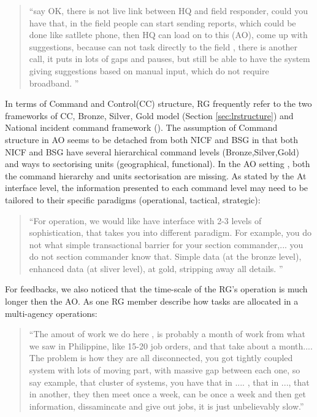 \begin{quotation}
``say  OK, there is not live link between HQ and field responder, could you have that, in the field people can start sending reports, which could be done like satllete phone, then HQ can load on to this (AO), come up with suggestions, because can not task directly to the field , there is another call,  it puts in lots of gaps and pauses, but still be able to have the system giving suggestions based on manual input, which do not require broadband. ''
\end{quotation}


In terms of Command and Control(CC) structure, RG frequently refer to the two frameworks of CC,  Bronze, Silver, Gold model (Section \ref{sec:lrstructure}) and National incident command framework (\cite{Command2008}). The assumption of Command structure in AO seems to be detached from both NICF and BSG in that both NICF and BSG have several hierarchical command levels (Bronze,Silver,Gold) and ways to sectorising units (geographical, functional).  In the AO setting , both the command hierarchy and units sectorisation are missing. As stated by the At interface level, the information presented to each command level may need to be tailored to their specific paradigms (operational, tactical, strategic):

\begin{quotation}
``For operation, we would like have interface with 2-3 levels of sophistication, that takes you into different paradigm. For example, you do not what simple transactional barrier for your section commander,...  you do not section commander know that. Simple data (at the bronze level), enhanced data (at sliver level), at gold, stripping away all details. ''
\end{quotation}

For feedbacks, we also noticed that the time-scale of the RG's operation is much longer then the AO. As one RG member describe how tasks are allocated in a multi-agency operations: 

\begin{quotation}
``The amout of work we do here , is probably a month of work from what we saw in Philippine, like 15-20 job orders, and that take about a month.... The problem is how they are all disconnected, you got tightly coupled system with lots of moving part, with massive gap between each one, so say example, that cluster of systems, you have that in .... , that in ..., that in another, they then meet once a week, can be once a week and then get information, dissamincate and give out jobs, it is just unbelievably slow.''
\end{quotation}

